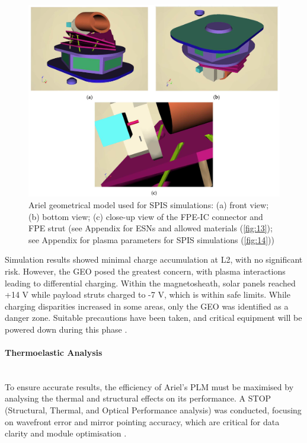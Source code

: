 \documentclass[12pt]{article}
\begin{document}
\begin{figure}[H]
    \centering
    \includegraphics[width=.7\textwidth]{autoCAD ariel simple.png}
    \caption{Ariel geometrical model used for SPIS simulations: (a) front view; (b) bottom view; (c) close-up view of the FPE-IC connector and FPE strut \protect\cite{Michelagnoli_Focardi_Pudney_Renouf_Merola_Noce_Nunez_Dinuzzi_Chiarucci_2024}
    \newline (see Appendix for ESNs and allowed materials (\protect\ref{fig:13}); see Appendix for plasma parameters for SPIS simulations (\protect\ref{fig:14}))}
    \label{fig:12}
\end{figure}

Simulation results showed minimal charge accumulation at L2, with no significant risk. However, the GEO posed the greatest concern, with plasma interactions leading to differential charging. Within the magnetosheath, solar panels reached +14 V while payload struts charged to -7 V, which is within safe limits.
While charging disparities increased in some areas, only the GEO was identified as a danger zone. Suitable precautions have been taken, and critical equipment will be powered down during this phase \cite{Michelagnoli_Focardi_Pudney_Renouf_Merola_Noce_Nunez_Dinuzzi_Chiarucci_2024}.

\paragraph{Thermoelastic Analysis} ~\\

To ensure accurate results, the efficiency of Ariel's PLM must be maximised by analysing the thermal and structural effects on its performance. A STOP (Structural, Thermal, and Optical Performance analysis) was conducted, focusing on wavefront error and mirror
pointing accuracy, which are critical for data clarity and module optimisation \cite{Garcia-Perez_Alonso_Gomez-San-Juan_Perez-Alvarez_2021}.
\end{document}
